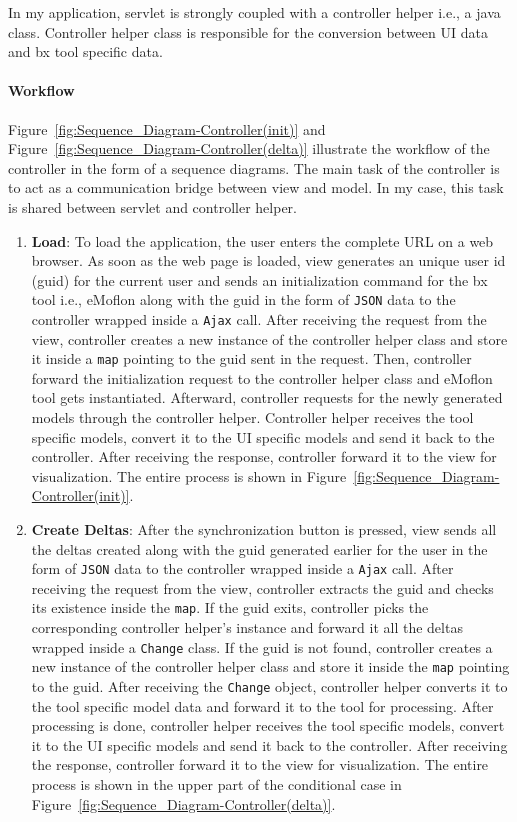 In my application, servlet is strongly coupled with a controller helper i.e., a java class. Controller helper class is responsible for the conversion between UI data and bx tool specific data.

\paragraph{Workflow}
Figure~\ref{fig:Sequence_Diagram-Controller(init)} and Figure~\ref{fig:Sequence_Diagram-Controller(delta)} illustrate the workflow of the controller in the form of a sequence diagrams. The main task of the controller is to act as a communication bridge between view and model. In my case, this task is shared between servlet and controller helper.

\begin{enumerate}
	\item {\textbf{Load}: To load the application, the user enters the complete URL on a web browser. As soon as the web page is loaded, view generates an unique user id (guid) for the current user and sends an initialization command for the bx tool i.e., eMoflon along with the guid in the form of \texttt{JSON} data to the controller wrapped inside a \texttt{Ajax} call. After receiving the request from the view, controller creates a new instance of the controller helper class and store it inside a \texttt{map} pointing to the guid sent in the request. Then, controller forward the initialization request to the controller helper class and eMoflon tool gets instantiated. Afterward, controller requests for the newly generated models through the controller helper. Controller helper receives the tool specific models, convert it to the UI specific models and send it back to the controller. After receiving the response, controller forward it to the view for visualization. The entire process is shown in Figure~\ref{fig:Sequence_Diagram-Controller(init)}.}
		
	\item {\textbf{Create Deltas}: After the synchronization button is pressed, view sends all the deltas created along with the guid generated earlier for the user in the form of \texttt{JSON} data to the controller wrapped inside a \texttt{Ajax} call. After receiving the request from the view, controller extracts the guid and checks its existence inside the \texttt{map}. If the guid exits, controller picks the corresponding controller helper's instance and forward it all the deltas wrapped inside a \texttt{Change} class. If the guid is not found, controller creates a new instance of the controller helper class and store it inside the \texttt{map} pointing to the guid. After receiving the \texttt{Change} object, controller helper converts it to the tool specific model data and forward it to the tool for processing. After processing is done, controller helper receives the tool specific models, convert it to the UI specific models and send it back to the controller. After receiving the response, controller forward it to the view for visualization. The entire process is shown in the upper part of the conditional case in Figure~\ref{fig:Sequence_Diagram-Controller(delta)}.}
	

\end{enumerate}
